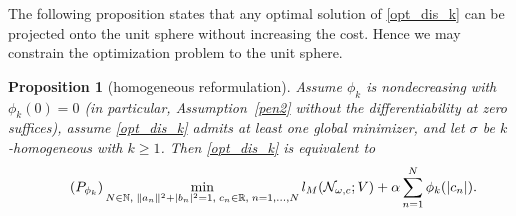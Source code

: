 \documentclass[11pt]{amsart}
\newtheorem{proposition}[theorem]{Proposition}
\theoremstyle{definition}
\theoremstyle{remark}
\begin{document}
The following proposition states that any optimal solution of \eqref{opt_dis_k} can be projected onto the unit sphere without increasing the cost. 
Hence we may constrain the optimization problem to the unit sphere. 
\begin{proposition}[homogeneous reformulation]
\label{prop:homogeneous_reformulation}
Assume $\phi_k$ is nondecreasing with $\phi_k(0) = 0$ (in particular, Assumption~\ref{pen2} without the differentiability at zero suffices), assume \eqref{opt_dis_k} admits at least one global minimizer, and let $\sigma$ be $k$-homogeneous with $k \ge 1$. Then \eqref{opt_dis_k} is equivalent to
\begin{equation*}
\tag{$P_{\phi_k}$}\label{discrete nonconvex problem}
		\min_{N \in \mathbb{N},\; \|a_n\|^2 + |b_n|^2 = 1,\; c_n \in \mathbb{R},\; n = 1, \dots, N} l_M(\mathcal{N}_{\omega, c}; V) + \alpha \sum_{n = 1}^N \phi_k(|c_n|).
\end{equation*}
\end{proposition}
\end{document}
